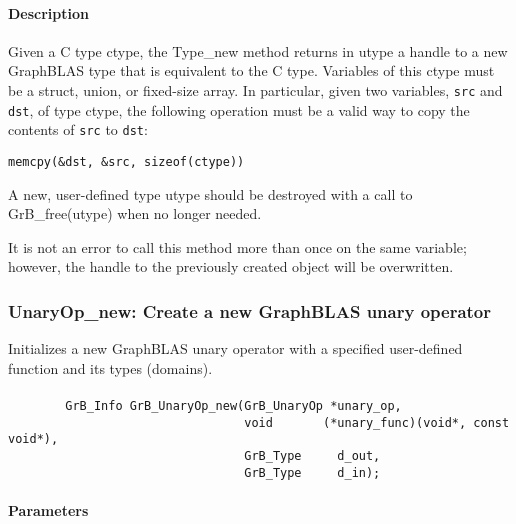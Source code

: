 \paragraph{Description}

Given a C type {\sf ctype}, the {\sf Type\_new} method returns in {\sf utype} a handle to
a new GraphBLAS type that is equivalent to the C type.  Variables of this {\sf ctype} 
must be a struct, union, or fixed-size array. In particular, given two variables, 
{\tt src} and {\tt dst}, of type {\sf ctype}, the following operation must be a 
valid way to copy the contents of {\tt src} to {\tt dst}:

\begin{center}
{\tt memcpy(\&dst, \&src, sizeof({\sf ctype}))}
\end{center}

A new, user-defined type {\sf utype} should be destroyed with a call to 
{\sf GrB\_free(utype)} when no longer needed.

It is not an error to call this method more than once on the same variable;  
however, the handle to the previously created object will be overwritten. 

\subsubsection{{\sf UnaryOp\_new}: Create a new GraphBLAS unary operator}

Initializes a new GraphBLAS unary operator with a specified user-defined 
function and its types (domains).

\paragraph{\syntax}

\begin{verbatim}
        GrB_Info GrB_UnaryOp_new(GrB_UnaryOp *unary_op,
                                 void       (*unary_func)(void*, const void*),
                                 GrB_Type     d_out,
                                 GrB_Type     d_in);
\end{verbatim}

\paragraph{Parameters}

